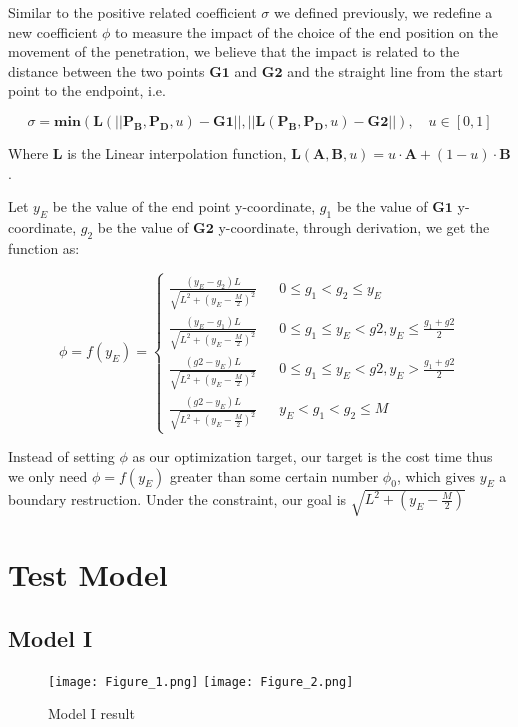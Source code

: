 \documentclass{mcmthesis}
\begin{document}
Similar to the positive related coefficient $\sigma$ we defined previously,  we redefine a new coefficient $\phi$ to measure the impact of the choice of the end position on the movement of the penetration,  we believe that the impact is related to the distance between the two points $\mathbf{G1}$ and $\mathbf{G2}$ and the straight line from the start point to the endpoint, i.e.

\begin{equation}
\sigma = \mathbf{min}(\mathbf{L}(\vert \vert \mathbf{P_B}, \mathbf{P_D}, u) - \mathbf{G1} \lvert \lvert, \lvert \lvert \mathbf{L}(\mathbf{P_B}, \mathbf{P_D}, u) - \mathbf{G2} \lvert \lvert), \quad u \in [0, 1]
\end{equation}

Where \textbf{L} is the Linear interpolation function, $\mathbf{L}(\mathbf{A}, \mathbf{B}, u) = u \cdot \mathbf{A} + (1 - u) \cdot \mathbf{B}$. \par

Let $y_E$ be the value of the end point y-coordinate, $g_1$ be the value of $\mathbf{G1}$ y-coordinate, $g_2$ be the value of $\mathbf{G2}$ y-coordinate, through derivation, we get the function as:

\begin{equation}
\phi=f(y_E)=\left\{
\begin{array}{rcl}
\frac{(y_E - g_2)L}{\sqrt{L^2+(y_E-\frac{M}{2})^2}} & & 0 \leq g_1 < g_2 \leq y_E \\  
\frac{(y_E - g_1)L}{\sqrt{L^2+(y_E-\frac{M}{2})^2}} & & 0 \leq g_1 \leq y_E < g2, y_E \leq \frac{g_1 + g2}{2}\\
\frac{(g2 - y_E)L}{\sqrt{L^2+(y_E-\frac{M}{2})^2}} & & 0 \leq g_1 \leq y_E < g2, y_E > \frac{g_1 + g2}{2}\\ 
\frac{(g2 - y_E)L}{\sqrt{L^2+(y_E-\frac{M}{2})^2}} & & y_E < g_1 < g_2 \leq M
\end{array} \right.
\end{equation}

Instead of setting $\phi$ as our optimization target, our target is the cost time thus we only need $\phi = f(y_E)$ greater than some certain number $\phi_0$, which gives $y_E$ a boundary restruction. Under the constraint, our goal is $\sqrt{L^2+(y_E - \frac{M}{2})}$

\section{Test Model}
\subsection{Model I}
\begin{figure}[h]
\small
\centering
\texttt{[image: Figure\_1.png]}
\texttt{[image: Figure\_2.png]}
\caption{Model I result} \label{fig:Model I result}
\end{figure}
\end{document}
